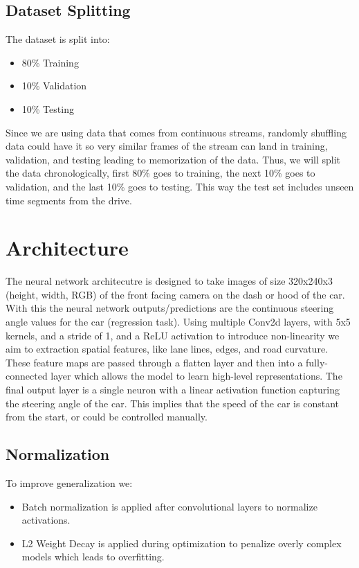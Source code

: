 \documentclass{article} %
\begin{document}
\subsection{Dataset Splitting}
The dataset is split into:
\begin{itemize}
  \item 80\% Training
  \item 10\% Validation 
  \item 10\% Testing 
\end{itemize}

Since we are using data that comes from continuous streams, randomly shuffling data could have
it so very similar frames of the stream can land in training, validation, and testing leading to 
memorization of the data. Thus, we will split the data chronologically, first 80\% goes to 
training, the next 10\% goes to validation, and the last 10\% goes to testing. This way the test set 
includes unseen time segments from the drive. 


\section{Architecture}

The neural network architecutre is designed to take images of size 320x240x3 (height, width, RGB) of the
front facing camera on the dash or hood of the car. With this the neural network outputs/predictions are the 
continuous steering angle values for the car (regression task). Using multiple Conv2d layers, with 5x5 kernels, 
and a stride of 1, and a ReLU activation to introduce non-linearity we aim to extraction spatial features, like 
lane lines, edges, and road curvature. These feature maps are passed through a flatten layer and then into 
a fully-connected layer which allows the model to learn high-level representations. The final output layer is a single neuron
with a linear activation function capturing the steering angle of the car. This implies that the speed of the car
is constant from the start, or could be controlled manually.

\subsection{Normalization}
To improve generalization we:
\begin{itemize}
  \item Batch normalization is applied after convolutional layers to normalize activations.
  \item L2 Weight Decay is applied during optimization to penalize overly complex models which leads to overfitting.
\end{itemize}
\end{document}
